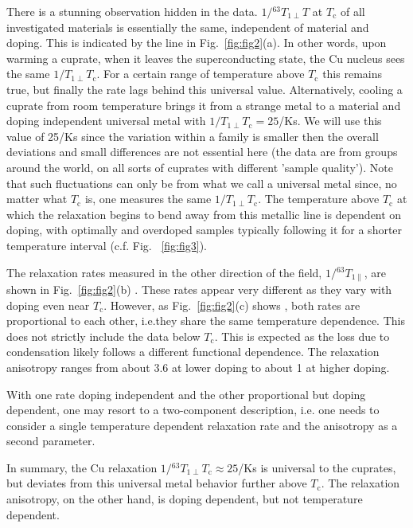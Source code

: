 \documentclass[preprint,superscriptaddress,amsmath,amssymb,aps,physrev,prb,floatfix, fleqn]{revtex4-2} \usepackage{bm} %
\makeatletter
\newcommand{\tc} {\ensuremath{T_{\mathrm c}}\@\xspace}
\makeatother
\begin{document}
There is a stunning observation hidden in the data. $1/{^{63}T}_{1\perp}T$ at \tc of all investigated materials is essentially the same, independent of material and doping. This is indicated by the line in Fig.~\ref{fig:fig2}(a). In other words, upon warming a cuprate, when it leaves the superconducting state, the Cu nucleus sees the same $1/T_{1\perp}T_\mathrm{c}$. For a certain range of temperature above \tc this remains true, but finally the rate lags behind this universal value. Alternatively, cooling a cuprate from room temperature brings it from a strange metal to a material and doping independent universal metal with $1/T_{1\perp}T_\mathrm{c} = 25$/Ks. We will use this value of 25/Ks since the variation within a family is smaller then the overall deviations and small differences are not essential here (the data are from groups around the world, on all sorts of cuprates with different 'sample quality'). 
Note that such fluctuations can only be from what we call a universal metal since, no matter what \tc is, one measures the same $1/T_{1\perp}T_\mathrm{c}$. 
The temperature above \tc at which the relaxation begins to bend away from this metallic line is dependent on doping, with optimally and overdoped samples typically following it for a shorter temperature interval (c.f. Fig. ~\ref{fig:fig3}).

The relaxation rates measured in the other direction of the field, $1/{^{63}T}_{1\parallel}$, are shown in Fig.~\ref{fig:fig2}(b) \cite{Jurkutat2019}. These rates appear very different as they vary with doping even near \tc. However, as Fig.~\ref{fig:fig2}(c) shows \cite{Jurkutat2019}, both rates are proportional to each other, i.e.\@ they share the same temperature dependence. This does not strictly include the data below \tc. This is expected as the loss due to condensation likely follows a different functional dependence. The relaxation anisotropy ranges from about 3.6 at lower doping to about 1 at higher doping. 

With one rate doping independent and the other proportional but doping dependent, one may resort to a two-component description, i.e. one needs to consider a single temperature dependent relaxation rate and the anisotropy as a second parameter. 

In summary, the Cu relaxation $1/{^{63}T_{1\perp}T_{\mathrm{c}}} \approx 25$/Ks is universal to the cuprates, but deviates from this universal metal behavior further above \tc. The relaxation anisotropy, on the other hand, is doping dependent, but not temperature dependent.
\end{document}
